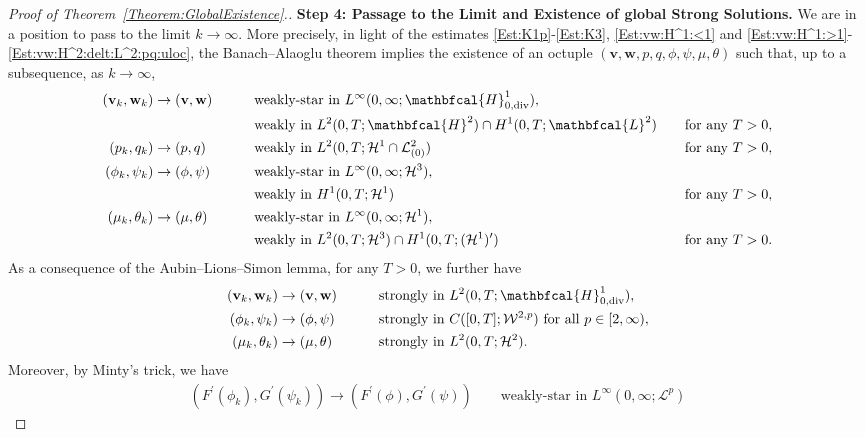 \documentclass[10pt,reqno]{amsart}
\theoremstyle{remark}
\numberwithin{equation}{section}
\newcommand{\bv}{\mathbf{v}}
\newcommand{\bw}{\mathbf{w}}
\newcommand{\Div}{\textnormal{div}}
\begin{document}
\begin{proof}[Proof of Theorem~\ref{Theorem:GlobalExistence}.]
\textbf{Step 4: Passage to the Limit and Existence of global Strong Solutions.}
We are in a position to pass to the limit $k\rightarrow\infty$. More precisely, in light of the estimates \eqref{Est:K1p}-\eqref{Est:K3}, \eqref{Est:vw:H^1:<1} and \eqref{Est:vw:H^1:>1}-\eqref{Est:vw:H^2:delt:L^2:pq:uloc}, the Banach--Alaoglu theorem implies the existence of an octuple $(\bv,\bw,p,q,\phi,\psi,\mu,\theta)$ such that, up to a subsequence, as $k\rightarrow\infty$,
\begin{alignat}{3}
    (\bv_k,\bw_k) &\rightarrow (\bv,\bw) &&\qquad\text{weakly-star in~} L^\infty(0,\infty;\mathbfcal{H}^1_{0,\Div}), && \label{Conv:vw:H^1}\\
    & &&\qquad\text{weakly in~} L^2(0,T;\mathbfcal{H}^2)\cap H^1(0,T;\mathbfcal{L}^2) &&\quad\text{for any~} T > 0, \\
    (p_k,q_k) &\rightarrow (p,q) &&\qquad\text{weakly in~} L^2(0,T;\mathcal{H}^1\cap\mathcal{L}^2_{(0)}) &&\quad\text{for any~} T > 0, \\
    (\phi_k,\psi_k) &\rightarrow (\phi,\psi) &&\qquad\text{weakly-star in~} L^\infty(0,\infty;\mathcal{H}^3), \label{Conv:delt:pp} && \\
    & &&\qquad\text{weakly in~} H^1(0,T;\mathcal{H}^1) &&\quad\text{for any~} T > 0, \\
    (\mu_k,\theta_k) &\rightarrow (\mu,\theta) &&\qquad\text{weakly-star in~} L^\infty(0,\infty;\mathcal{H}^1), && \\
    & &&\qquad\text{weakly in~} L^2(0,T;\mathcal{H}^3)\cap H^1(0,T;(\mathcal{H}^1)^\prime) &&\quad \text{for any~} T > 0. 
    \label{Conv:mt:H^1}
\end{alignat}
As a consequence of the Aubin--Lions--Simon lemma, for any $T > 0$, we further have
\begin{alignat}{2}
    (\bv_k,\bw_k) &\rightarrow (\bv,\bw) &&\qquad\text{strongly in~} L^2(0,T;\mathbfcal{H}^1_{0,\Div}), \\
    (\phi_k,\psi_k) &\rightarrow (\phi,\psi) &&\qquad\text{strongly in~} C([0,T];\mathcal{W}^{2,p}) \ \text{for all~}p\in[2,\infty), \label{Conv:pp:strong}\\
    (\mu_k,\theta_k) &\rightarrow (\mu,\theta) &&\qquad\text{strongly in~} L^2(0,T;\mathcal{H}^2).
\end{alignat}
Moreover, by Minty's trick, we have
\begin{align*}
    (F^\prime(\phi_k), G^\prime(\psi_k)) \rightarrow (F^\prime(\phi),G^\prime(\psi)) \qquad\text{weakly-star in~}L^\infty(0,\infty;\mathcal{L}^p)
\end{align*}

\end{proof}
\end{document}
